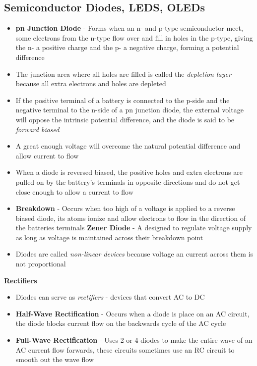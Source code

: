 \subsection{Semiconductor Diodes, LEDS, OLEDs}
\begin{itemize}
    \item \textbf{pn Junction Diode} - Forms when an n- and p-type semiconductor meet, some electrons from the n-type flow over and fill in holes in the p-type, giving the n- a positive charge and the p- a negative charge, forming a potential difference
    \item The junction area where all holes are filled is called the \emph{depletion layer} because all extra electrons and holes are depleted
    \item If the positive terminal of a battery is connected to the p-side and the negative terminal to the n-side of a pn junction diode, the external voltage will oppose the intrinsic potential difference, and the diode is said to be \emph{forward biased}
    \item A great enough voltage will overcome the natural potential difference and allow current to flow
    \item When a diode is reversed biased, the positive holes and extra electrons are pulled on by the battery's terminals in opposite directions and do not get close enough to allow a current to flow
    \item \textbf{Breakdown} - Occurs when too high of a voltage is applied to a reverse biased diode, its atoms ionize and allow electrons to flow in the direction of the batteries terminals
    \textbf{Zener Diode} - A designed to regulate voltage supply as long as voltage is maintained across their breakdown point
    \item Diodes are called \emph{non-linear devices} because voltage an current across them is not proportional 
\end{itemize}

\textbf{Rectifiers}
\begin{itemize}
    \item Diodes can serve as \emph{rectifiers} - devices that convert AC to DC 
    \item \textbf{Half-Wave Rectification} - Occurs when a diode is place on an AC circuit, the diode blocks current flow on the backwards cycle of the AC cycle
    \item \textbf{Full-Wave Rectification} - Uses 2 or 4 diodes to make the entire wave of an AC current flow forwards, these circuits sometimes use an RC circuit to smooth out the wave flow
\end{itemize}

